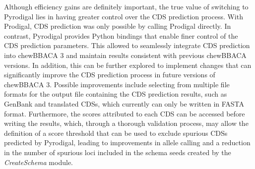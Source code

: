 Although efficiency gains are definitely important, the true value of switching to Pyrodigal lies in having greater control over the \ac{CDS} prediction process. With Prodigal, \ac{CDS} prediction was only possible by calling Prodigal directly. In contrast, Pyrodigal provides Python bindings that enable finer control of the \ac{CDS} prediction parameters. This allowed to seamlessly integrate \ac{CDS} prediction into chewBBACA 3 and maintain results consistent with previous chewBBACA versions. In addition, this can be further explored to implement changes that can significantly improve the \ac{CDS} prediction process in future versions of chewBBACA 3. Possible improvements include selecting from multiple file formats for the output file containing the \ac{CDS} prediction results, such as GenBank and translated \acp{CDS}, which currently can only be written in FASTA format. Furthermore, the scores attributed to each \ac{CDS} can be accessed before writing the results, which, through a thorough validation process, may allow the definition of a score threshold that can be used to exclude spurious \acp{CDS} predicted by Pyrodigal, leading to improvements in allele calling and a reduction in the number of spurious loci included in the schema seeds created by the \textit{CreateSchema} module.

